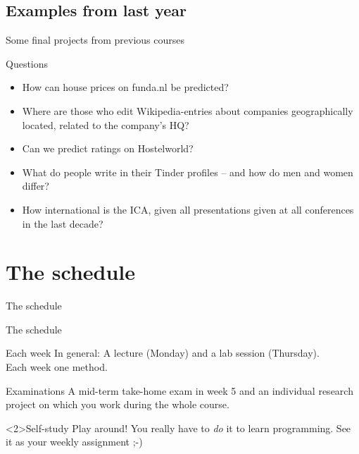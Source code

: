 \documentclass{beamer}
\begin{document}
\subsection{Examples from last year}
\begin{frame}{Some final projects from previous courses}
\begin{block}{Questions}
\begin{itemize}
\item How can house prices on funda.nl be predicted?
\item Where are those who edit Wikipedia-entries about companies geographically located, related to the company's HQ?
\item Can we predict ratings on Hostelworld?
\item What do people write in their Tinder profiles -- and how do men and women differ?
\item How international is the ICA, given all presentations given at all conferences in the last decade?
\end{itemize}
\end{block}

\end{frame}


\section{The schedule}
\begin{frame}
The schedule
\end{frame}

\begin{frame}{The schedule}
\begin{block}{Each week}
In general: A lecture (Monday) and a lab session (Thursday). \\ Each week one method.
\end{block}
\begin{block}{Examinations}
A mid-term take-home exam in week 5 and an individual research project on which you work during the whole course.
\end{block}


\begin{alertblock}<2>{Self-study}
Play around! You really have to \emph{do} it to learn programming. See it as your weekly assignment ;-)
\end{alertblock}
\end{frame}
\end{document}
